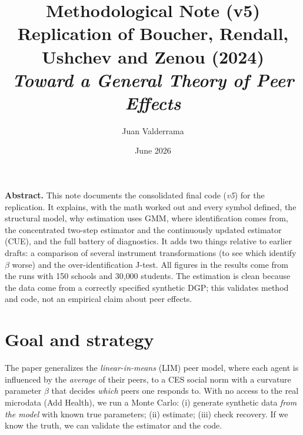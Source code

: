 \documentclass[11pt]{article}
\title{\vspace{-1.2cm}\sffamily\bfseries\color{ink} Methodological Note (v5)\\[2pt]
\large Replication of Boucher, Rendall, Ushchev and Zenou (2024)\\
\large\itshape Toward a General Theory of Peer Effects}
\author{Juan Valderrama}
\date{June 2026}
\begin{document}
\maketitle
\vspace{-0.7cm}

\noindent\textbf{Abstract.} This note documents the consolidated final code (\emph{v5}) for the replication. It explains, with the math worked out and every symbol defined, the structural model, why estimation uses GMM, where identification comes from, the concentrated two-step estimator and the continuously updated estimator (CUE), and the full battery of diagnostics. It adds two things relative to earlier drafts: a comparison of several instrument transformations (to see which identify $\beta$ worse) and the over-identification J-test. All figures in the results come from the runs with 150 schools and 30{,}000 students. The estimation is clean because the data come from a correctly specified synthetic DGP; this validates method and code, not an empirical claim about peer effects.

\section{Goal and strategy}
The paper generalizes the \emph{linear-in-means} (LIM) peer model, where each agent is influenced by the \emph{average} of their peers, to a CES social norm with a curvature parameter $\beta$ that decides \emph{which} peers one responds to. With no access to the real microdata (Add Health), we run a Monte Carlo: (i) generate synthetic data \emph{from the model} with known true parameters; (ii) estimate; (iii) check recovery. If we know the truth, we can validate the estimator and the code.
\end{document}
